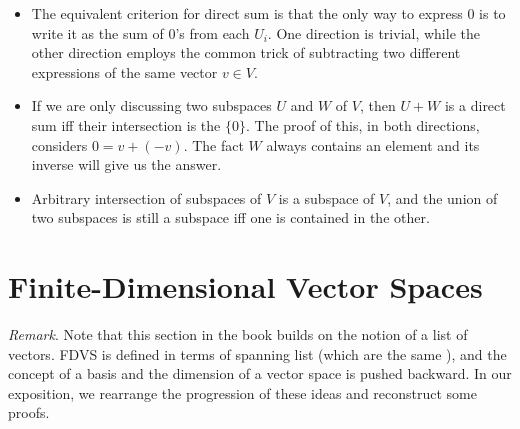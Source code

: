 \documentclass{article}
\begin{document}
\begin{itemize}
    \item The equivalent criterion for direct sum is that the only way to express $0$ is to write it as the sum of $0$'s from each $U_i$. One direction is trivial, while the other direction employs the common trick of subtracting two different expressions of the same vector $v \in V$.
    \item If we are only discussing two subspaces $U$ and $W$ of $V$, then $U+W$ is a direct sum iff their intersection is the $\{0\}$. The proof of this, in both directions, considers $0 = v + (-v)$. The fact $W$ always contains an element and its inverse will give us the answer.
    \item Arbitrary intersection of subspaces of $V$ is a subspace of $V$, and the union of two subspaces is still a subspace iff one is contained in the other.
\end{itemize}

\section{Finite-Dimensional Vector Spaces}

\textit{Remark}. Note that this section in the book builds on the notion of a list of vectors. FDVS is defined in terms of spanning list (which are the same ), and the concept of a basis and the dimension of a vector space is pushed backward. In our exposition, we rearrange the progression of these ideas and reconstruct some proofs.
\end{document}
